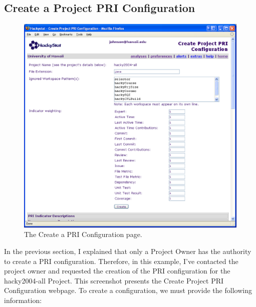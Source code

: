 \clearpage
\subsection{Create a Project PRI Configuration}
\label{subsection:createPriConfiguration}
\begin{figure}[ht]
  \centering
  \includegraphics[width=1.00\textwidth]{figs/UserInterface/preference-createConfig-hacky2004all-johnson-full.eps}
  \caption[Create Project PRI Configuration]{The Create a PRI Configuration 
    page.}
  \label{fig:preference-createConfig-hacky2004-all-jonhson-full}
\end{figure}
In the previous section, I explained that only a Project Owner has the
authority to create a PRI configuration. Therefore, in this example, I've
contacted the project owner and requested the creation of the PRI
configuration for the hacky2004-all Project. This screenshot presents the
Create Project PRI Configuration webpage. To create a configuration, we
must provide the following information:

